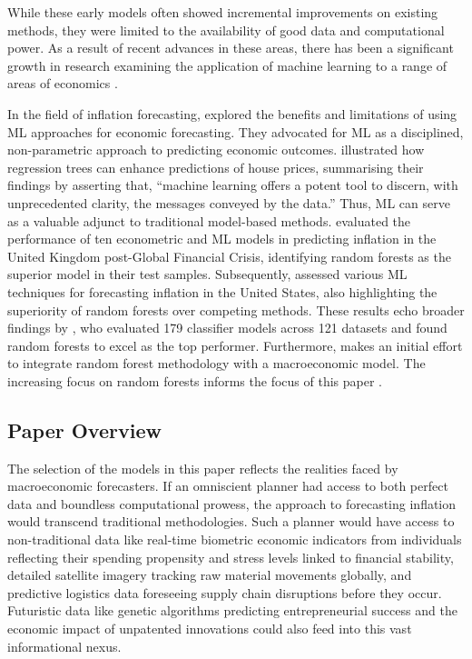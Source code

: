 While these early models often showed incremental improvements on existing methods, they were limited to the availability of good data and computational power. As a result of recent advances in these areas, there has been a significant growth in research examining the application of machine learning to a range of areas of economics \autocite{Athey2019TheEconomics}.

In the field of inflation forecasting, \textcite{Kleinberg2015PredictionProblems} explored the benefits and limitations of using ML approaches for economic forecasting. They advocated for ML as a disciplined, non-parametric approach to predicting economic outcomes. \textcite{Mullainathan2017MachineApproach} illustrated how regression trees can enhance predictions of house prices, summarising their findings by asserting that, ``machine learning offers a potent tool to discern, with unprecedented clarity, the messages conveyed by the data.” Thus, ML can serve as a valuable adjunct to traditional model-based methods. \textcite{Chakraborty2017MachineBanks} evaluated the performance of ten econometric and ML models in predicting inflation in the United Kingdom post-Global Financial Crisis, identifying random forests as the superior model in their test samples. Subsequently, \textcite{Medeiros2021ForecastingMethods} assessed various ML techniques for forecasting inflation in the United States, also highlighting the superiority of random forests over competing methods. These results echo broader findings by \textcite{Fernandez-Delgado2014DoProblems}, who evaluated 179 classifier models across 121 datasets and found random forests to excel as the top performer. Furthermore, \textcite{GouletCoulombe2024TheForest} makes an initial effort to integrate random forest methodology with a macroeconomic model. The increasing focus on random forests informs the focus of this paper \autocite{Kohlscheen2021WhatInflation}.

\subsection{Paper Overview}

The selection of the models in this paper reflects the realities faced by macroeconomic forecasters. If an omniscient planner had access to both perfect data and boundless computational prowess, the approach to forecasting inflation would transcend traditional methodologies. Such a planner would have access to non-traditional data like real-time biometric economic indicators from individuals reflecting their spending propensity and stress levels linked to financial stability, detailed satellite imagery tracking raw material movements globally, and predictive logistics data foreseeing supply chain disruptions before they occur. Futuristic data like genetic algorithms predicting entrepreneurial success and the economic impact of unpatented innovations could also feed into this vast informational nexus.

